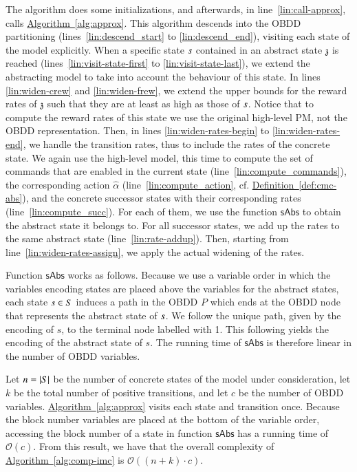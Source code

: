 \documentclass[10pt,twocolumn]{article}
\newcommand{\fctcall}[1]{\ensuremath{\mathsf{#1}}}
\newcommand{\states} {{\ensuremath S}}
\newcommand{\state}  {{\ensuremath s}}
\newcommand{\partition}{\ensuremath{P}}
\newcommand{\astate}{\mathfrak{z}}
\newcommand{\refdef}[1]{\texorpdfstring{\hyperref[def:#1]{Definition~\ref*{def:#1}}}{Definition \ref*{def:#1}}}
\newcommand{\refalg}[1]{\texorpdfstring{\hyperref[alg:#1]{Algorithm~\ref*{alg:#1}}}{Algorithm~\ref*{alg:#1}}}
\begin{document}
The algorithm does some initializations, and afterwards, in line~\ref{lin:call-approx}, calls
\refalg{approx}. This algorithm descends into
the OBDD partitioning (lines~\ref{lin:descend_start} to \ref{lin:descend_end}), visiting each state of the model
explicitly. When a specific state $\state$ contained in an abstract
state $\astate$ is reached (lines~\ref{lin:visit-state-first} to
\ref{lin:visit-state-last}), we extend the abstracting model to take
into account the behaviour of this state. In lines
\ref{lin:widen-crew} and \ref{lin:widen-frew}, we extend the upper
bounds for the reward rates of $\astate$ such that they are at least
as high as those of $\state$. Notice that to compute the reward rates
of this state we use the original high-level PM, not the OBDD
representation. Then, in lines \ref{lin:widen-rates-begin} to
\ref{lin:widen-rates-end}, we handle the transition rates, thus to
include the rates of the concrete state. We again use the high-level
model, this time to compute the set of commands that are enabled in the current state
(line~\ref{lin:compute_commands}), the corresponding action
$\hat\alpha$ (line~\ref{lin:compute_action}, cf. \refdef{cmc-abs}), and the concrete successor states
with their corresponding rates (line~\ref{lin:compute_succ}). For each
of them, we use the function \fctcall{sAbs} to obtain the abstract state 
it belongs to. 
For all successor states, we add up the
rates to the same abstract state (line~\ref{lin:rate-addup}).
Then, starting from line~\ref{lin:widen-rates-assign},
we apply the actual widening of the rates.

Function \fctcall{sAbs} works as follows. Because we use a variable
order in which the variables encoding states are placed above the
variables for the abstract states, each state $\state\in\states$
induces a path in the OBDD $\partition$ which ends at the OBDD node
that represents the abstract state of $\state$. We follow the unique
path, given by the encoding of $s$, to the terminal node labelled with
1. This following yields the encoding of the abstract state of $s$. The running time
of \fctcall{sAbs} is therefore linear in the number of OBDD variables.

Let $n = |\states|$ be the number of concrete states of the model
under consideration, let $k$ be the total number of positive
transitions, and let $c$ be the number of OBDD variables.
\refalg{approx} visits each state and transition once. Because the block
number variables are placed at the bottom of the variable order,
accessing the block number of a state in  function \fctcall{sAbs}
has a running time of $\mathcal{O}(c)$. From this result, we
have that the overall complexity of \refalg{comp-imc} is
$\mathcal{O}((n + k) \cdot c)$.
\end{document}
